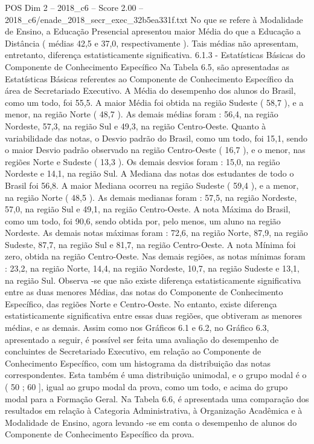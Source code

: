 \begin{textsample}{POS Dim 2 – 2018\_c6 – Score 2.00 – 2018\_c6/enade\_2018\_secr\_exec\_32b5ea331f.txt}
No que se refere à Modalidade de Ensino, a Educação Presencial apresentou maior Média do que a Educação a Distância ( médias 42,5 e 37,0, respectivamente ).
Tais médias não apresentam, entretanto, diferença estatisticamente significativa. 6.1.3 - Estatísticas Básicas do Componente de Conhecimento Específico Na Tabela 6.5, são apresentadas as Estatísticas Básicas referentes ao Componente de Conhecimento Específico da área de Secretariado Executivo.
A Média do desempenho dos alunos do Brasil, como um todo, foi 55,5.
A maior Média foi obtida na região Sudeste ( 58,7 ), e a menor, na região Norte ( 48,7 ).
As demais médias foram : 56,4, na região Nordeste, 57,3, na região Sul e 49,3, na região Centro-Oeste.
Quanto à variabilidade das notas, o Desvio padrão do Brasil, como um todo, foi 15,1, sendo o maior Desvio padrão observado na região Centro-Oeste ( 16,7 ), e o menor, nas regiões Norte e Sudeste ( 13,3 ).
Os demais desvios foram : 15,0, na região Nordeste e 14,1, na região Sul.
A Mediana das notas dos estudantes de todo o Brasil foi 56,8.
A maior Mediana ocorreu na região Sudeste ( 59,4 ), e a menor, na região Norte ( 48,5 ).
As demais medianas foram : 57,5, na região Nordeste, 57,0, na região Sul e 49,1, na região Centro-Oeste.
A nota Máxima do Brasil, como um todo, foi 90,6, sendo obtida por, pelo menos, um aluno na região Nordeste.
As demais notas máximas foram : 72,6, na região Norte, 87,9, na região Sudeste, 87,7, na região Sul e 81,7, na região Centro-Oeste.
A nota Mínima foi zero, obtida na região Centro-Oeste.
Nas demais regiões, as notas mínimas foram : 23,2, na região Norte, 14,4, na região Nordeste, 10,7, na região Sudeste e 13,1, na região Sul.
Observa -se que não existe diferença estatisticamente significativa entre as duas menores Médias, das notas do Componente de Conhecimento Específico, das regiões Norte e Centro-Oeste.
No entanto, existe diferença estatisticamente significativa entre essas duas regiões, que obtiveram as menores médias, e as demais.
Assim como nos Gráficos 6.1 e 6.2, no Gráfico 6.3, apresentado a seguir, é possível ser feita uma avaliação do desempenho de concluintes de Secretariado Executivo, em relação ao Componente de Conhecimento Específico, com um histograma da distribuição das notas correspondentes.
Esta também é uma distribuição unimodal, e o grupo modal é o ( 50 ; 60 ], igual ao grupo modal da prova, como um todo, e acima do grupo modal para a Formação Geral.
Na Tabela 6.6, é apresentada uma comparação dos resultados em relação à Categoria Administrativa, à Organização Acadêmica e à Modalidade de Ensino, agora levando -se em conta o desempenho de alunos do Componente de Conhecimento Específico da prova.

\end{textsample}
